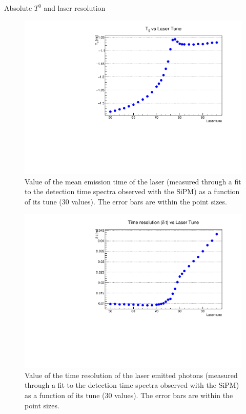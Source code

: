 \documentclass[a4paper,11pt]{article}
\begin{document}
\begin{subsection}{Absolute $T^0$ and laser resolution}
\begin{figure}
\begin{center}
\includegraphics[scale=0.7]{plots/SiPM_T0distr}
\caption{Value of the mean emission time of the laser (measured through a fit to the detection time spectra observed with the SiPM) as a function of its tune (30 values). The error bars are within the point sizes.}
\label{fig:SiPM_Tdistr}
\end{center}
\end{figure}
\begin{figure}
\begin{center}
\includegraphics[scale=0.7]{plots/SiPM_res0distr}
\caption{Value of the time resolution of the laser emitted photons (measured through a fit to the detection time spectra observed with the SiPM) as a function of its tune (30 values). The error bars are within the point sizes.}
\label{fig:SiPM_sigmadistr}
\end{center}
\end{figure}


\end{subsection}
\end{document}
